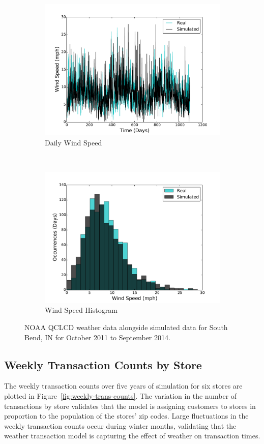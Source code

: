 \documentclass[conference]{IEEEtran}
\begin{document}
\begin{figure}[!t]
\begin{subfigure}[b]{0.4\textwidth}
    \includegraphics[width=\textwidth]{figures/daily_wind_speeds.pdf}
    \caption{Daily Wind Speed}
  \end{subfigure}
  ~
  \begin{subfigure}[b]{0.4\textwidth}
    \includegraphics[width=\textwidth]{figures/daily_wind_speed_hist.pdf}
    \caption{Wind Speed Histogram}
  \end{subfigure}

  \caption{NOAA QCLCD weather data alongside simulated data for South Bend, IN for October 2011 to September 2014.}
  \label{fig:weather-model}  
\end{figure}

\subsection{Weekly Transaction Counts by Store}
The weekly transaction counts over five years of simulation for six stores are plotted in Figure~\ref{fig:weekly-trans-counts}.  The variation in the number of transactions by store validates that the model is assigning customers to stores in proportion to the population of the stores' zip codes.  Large fluctuations in the weekly transaction counts occur during winter months, validating that the weather transaction model is capturing the effect of weather on transaction times.
\end{document}
